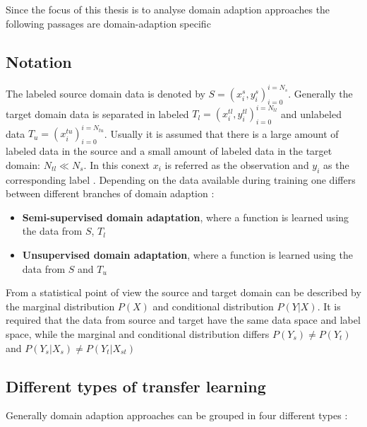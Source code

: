 Since the focus of this thesis is to analyse domain adaption approaches the following passages are domain-adaption specific
\subsection{Notation}
The labeled source domain data is denoted by  $S = {(x_{i}^{s}, y_{i}^{s})_{i = 0}^{i = N_{s}}}$. Generally the target domain data is separated in labeled $T_{l} = {(x_{i}^{tl}, y_{i}^{tl})_{i = 0}^{i = N_{tl}}}$ and unlabeled data $T_{u} = {(x_{i}^{tu})_{i = 0}^{i = N_{tu}}}$. Usually it is assumed that there is a large amount of labeled data in the source and a small amount of labeled data in the target domain: $N_{tl} \ll N_{s}$. In this conext $x_{i}$ is referred as the observation and $y_{i}$ as the corresponding label  \cite{Patel2015}. Depending on the data available during training one differs between different branches of domain adaption \cite{Patel2015}: 
\begin{itemize}
\item \textbf{Semi-supervised domain adaptation}, where a function is learned using the data from $S$, $T_{l}$
\item \textbf{Unsupervised domain adaptation}, where a function is learned using the data from $S$ and $T_{u}$ 
\end{itemize}

From a statistical point of view the source and target domain can be described by the marginal distribution $P(X)$ and conditional distribution $P(Y|X)$. It is required that the data from source and target have the same data space and label space, while the marginal and conditional distribution differs $P(Y_{s}) \neq P(Y_{t})$ and $P(Y_{s}|X_{s}) \neq P(Y_{t}|X_{st})$ \cite{Qikang2020}

\subsection{Different types of transfer learning}
Generally domain adaption approaches can be grouped in four different types \cite{AZAMFAR2020103932}:  

